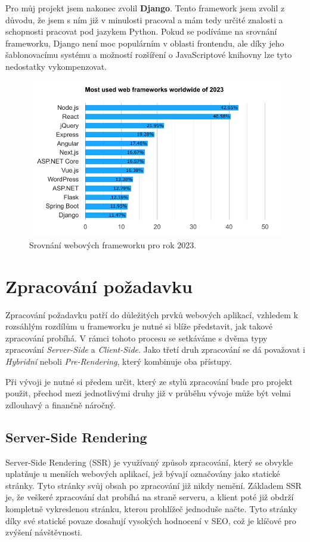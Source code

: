 Pro můj projekt jsem nakonec zvolil \textbf{Django}. Tento framework jsem zvolil z důvodu, že jsem s ním již v minulosti pracoval a mám tedy určité znalosti a schopnosti pracovat pod jazykem Python. Pokud se podíváme na srovnání frameworku, Django není moc populárním v oblasti frontendu, ale díky jeho šablonovacímu systému a možností rozšíření o JavaScriptové knihovny lze tyto nedostatky vykompenzovat.

\begin{figure}[H]
    \centering
    \includegraphics{diagrams/frameworkGraphs}
    \caption{Srovnání webových frameworku pro rok 2023. \cite{framework_comparison}}
    \label{fig:framework_comparison}
\end{figure}

\section{Zpracování požadavku}
\label{sec:dev-request-processing}
Zpracování požadavku patří do důležitých prvků webových aplikací, vzhledem k rozsáhlým rozdílům u frameworku je nutné si blíže představit, jak takové zpracování probíhá. V rámci tohoto procesu se setkáváme s dvěma typy zpracování \textit{Server-Side} a \textit{Client-Side}. Jako třetí druh zpracování se dá považovat i \textit{Hybridní} neboli \textit{Pre-Rendering}, který kombinuje oba přístupy.

Při vývoji je nutné si předem určit, který ze stylů zpracování bude pro projekt použit, přechod mezi jednotlivými druhy již v průběhu vývoje může být velmi zdlouhavý a finančně náročný. \cite{request_processing}

\subsection{Server-Side Rendering}
\label{subsec:dev-request-processing-server-side-rendering}
Server-Side Rendering (SSR) je využívaný způsob zpracování, který se obvykle uplatňuje u menších webových aplikací, jež bývají označovány jako statické stránky. Tyto stránky svůj obsah po zpracování již nikdy nemění. Základem SSR je, že veškeré zpracování dat probíhá na straně serveru, a klient poté již obdrží kompletně vykreslenou stránku, kterou prohlížeč jednoduše načte. Tyto stránky díky své statické povaze dosahují vysokých hodnocení v SEO, což je klíčové pro zvýšení návštěvnosti.


